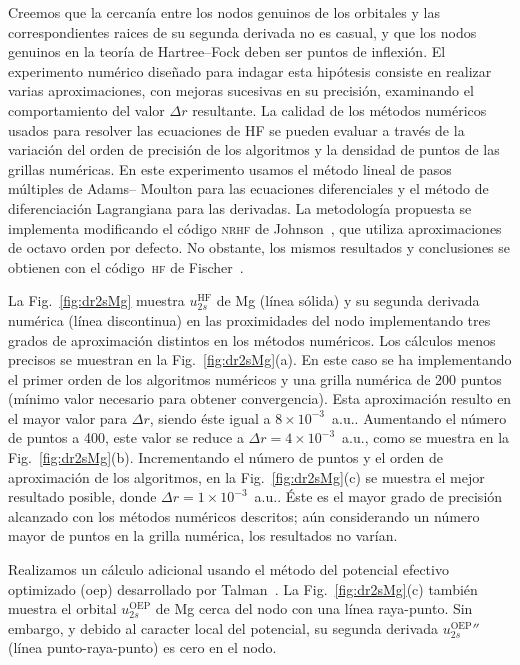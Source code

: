 Creemos que la cercanía entre los nodos genuinos de los orbitales y las 
correspondientes raices de su segunda derivada no es casual, y que los 
nodos genuinos en la teoría de Hartree--Fock deben ser puntos de 
inflexión. El experimento numérico diseñado para indagar esta hipótesis 
consiste en realizar varias aproximaciones, con mejoras sucesivas en su 
precisión, examinando el comportamiento del valor $\Delta r$ resultante. 
La calidad de los métodos numéricos usados para resolver las ecuaciones 
de HF se pueden evaluar a través de la variación del orden de precisión 
de los algoritmos y la densidad de puntos de las grillas numéricas. En 
este experimento usamos el método lineal de pasos múltiples de Adams--
Moulton para las ecuaciones diferenciales y el método de diferenciación 
Lagrangiana para las derivadas. La metodología propuesta se implementa 
modificando el código \textsc{nrhf} de Johnson~\cite{Johnson:07}, que 
utiliza aproximaciones de octavo orden por defecto. No obstante, los 
mismos resultados y conclusiones se obtienen con el código~\textsc{hf} 
de Fischer~\cite{FroeseFischer:97}.

La Fig.~\ref{fig:dr2sMg} muestra $u_{2s}^{\mathrm{HF}}$ de Mg (línea 
sólida) y su segunda derivada numérica (línea discontinua) en las 
proximidades del nodo implementando tres grados de aproximación 
distintos en los métodos numéricos. Los cálculos menos precisos se 
muestran en la  Fig.~\ref{fig:dr2sMg}(a). En este caso se ha 
implementando el primer orden de los algoritmos numéricos y una grilla 
numérica de 200 puntos (mínimo valor necesario para obtener 
convergencia). Esta aproximación resulto en el mayor valor para 
$\Delta r$, siendo éste igual a $8\times 10^{-3}$~a.u.. Aumentando el 
número de puntos a 400, este valor se reduce a 
$\Delta r=4\times 10^{-3}$~a.u., como se muestra en la 
Fig.~\ref{fig:dr2sMg}(b). Incrementando el número de puntos y el orden 
de aproximación de los algoritmos, en la Fig.~\ref{fig:dr2sMg}(c) se 
muestra el mejor resultado posible, donde 
$\Delta r=1\times 10^{-3}$~a.u.. Éste es el mayor grado de precisión 
alcanzado con los métodos numéricos descritos; aún considerando un 
número mayor de puntos en la grilla numérica, los resultados no varían. 

Realizamos un cálculo adicional usando el método del potencial efectivo 
optimizado (\acs{oep}) desarrollado por Talman~\cite{Sharp:53,Talman:76,
Talman:89}. La Fig.~\ref{fig:dr2sMg}(c) también muestra el orbital 
$u_{2s}^{\mathrm{OEP}}$ de Mg cerca del nodo con una línea raya-punto. 
Sin embargo, y debido al caracter local del potencial, su segunda 
derivada $u_{2s}^{\mathrm{OEP}}''$ (línea punto-raya-punto) es cero en 
el nodo. 

